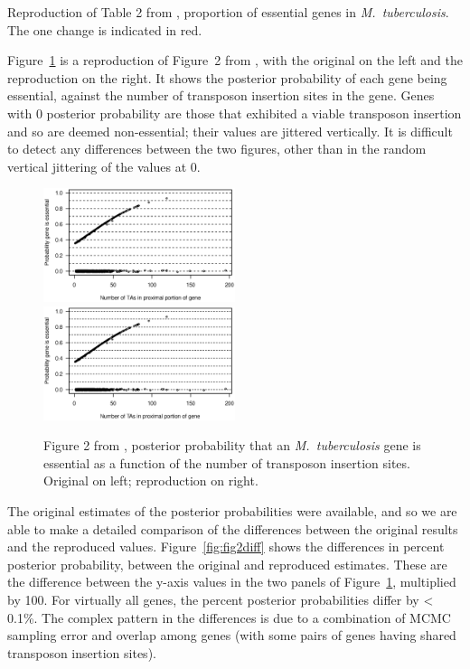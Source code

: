\begin{table}
\caption{Reproduction of Table 2 from \citet{lamichhane2003}, proportion
of essential genes in \emph{M.\ tuberculosis}. The one
change is indicated in red.\label{tab:tab2}}

\centering

\end{table}


Figure~\ref{fig:fig2} is a reproduction of Figure~2
from \citet{lamichhane2003}, with the original on the left and
the reproduction on the right. It shows the posterior probability of
each gene being essential, against the number of transposon insertion sites
in the gene. Genes with 0 posterior probability
are those that exhibited a viable transposon insertion and so are
deemed non-essential; their values are jittered vertically. It is
difficult to detect any differences between the two figures, other
than in the random vertical jittering of the values at 0.

\begin{figure}[b]
\includegraphics[viewport=44 245 525 508, width=0.50\textwidth]{../original/Nov02/R/Figs/fig2.ps}
\hfill
\includegraphics[viewport=44 245 525 508, width=0.50\textwidth]{../reproduction/Figs/fig2.ps}

\caption{Figure 2 from \citet{lamichhane2003}, posterior probability
that an \emph{M.\ tuberculosis\/} gene is essential as a function of
the number of transposon insertion sites. Original on left;
reproduction on right.\label{fig:fig2}}
\end{figure}

The original estimates of the posterior probabilities were available, and
so we are able to make a detailed comparison of the differences
between the original results and the reproduced values.
Figure~\ref{fig:fig2diff} shows the differences in percent posterior
probability, between the original and reproduced estimates.
These are the difference between the y-axis values in the two panels
of Figure~\ref{fig:fig2}, multiplied by 100. For virtually all genes,
the percent posterior probabilities differ by < 0.1\%. The complex
pattern in the differences is due to a combination of MCMC sampling
error and overlap among genes (with some pairs of genes having shared
transposon insertion sites).

